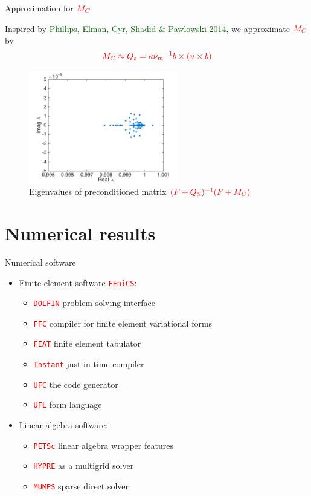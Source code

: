 \documentclass[12pt]{beamer}
\newcommand{\gr}[1]{\textcolor{darkgreen} {#1}}
\newcommand{\re}[1]{{\textcolor{red}       {#1}}}
\begin{document}
\begin{frame}{Approximation for $\re{M_C}$}

Inspired by \gr{Phillips, Elman, Cyr, Shadid \& Pawlowski 2014}, we approximate $\re{M_C}$ by
$$\re{{M_C}\approx Q_s = {\kappa}{\nu_m}^{-1} {b} \times ({u}\times{b})}$$



\vspace{-4mm}


\begin{figure}[h]
    \begin{center}
    \includegraphics[width=65mm]{figures/mass}
    \end{center}
    \caption{Eigenvalues of preconditioned matrix $\re{(F+Q_S)^{-1}(F+M_C)}$ }
    \label{pics:blablabla}
\end{figure}

\end{frame}


\section{Numerical results}

\begin{frame}{Numerical software}

\begin{itemize}
  \item Finite element software \re{\tt FEniCS}:
  \begin{itemize}
    \item \re{\tt DOLFIN} problem-solving interface
    \item \re{\tt FFC} compiler for finite element variational forms
    \item \re{\tt FIAT}  finite element  tabulator
    \item \re{\tt Instant} just-in-time compiler
    \item \re{\tt UFC}  the code generator
    \item \re{\tt UFL} form language
  \end{itemize}
  \item Linear algebra software:
  \begin{itemize}
    \item \re{\tt PETSc} linear algebra wrapper features
    \item \re{\tt HYPRE} as a multigrid solver
    \item \re{\tt MUMPS} sparse direct solver
  \end{itemize}
\end{itemize}
\end{frame}
\end{document}
